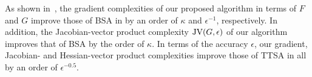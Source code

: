 \documentclass{osudissert96}
\begin{document}


As shown in~, the gradient complexities of our proposed algorithm in terms of  $F$  and $G$  improve those of BSA in \cite{ghadimi2018approximation} by an order of $\kappa$ and $\epsilon^{-1}$, respectively. In addition, the Jacobian-vector product complexity $\mbox{\normalfont JV}(G,\epsilon)$ of our algorithm improves that of BSA by the order of $\kappa$. 
In terms of the accuracy $\epsilon$, our gradient,  Jacobian- and Hessian-vector product complexities  improve those of TTSA in \cite{hong2020two} all by an order of $\epsilon^{-0.5}$.  %
\end{document}
